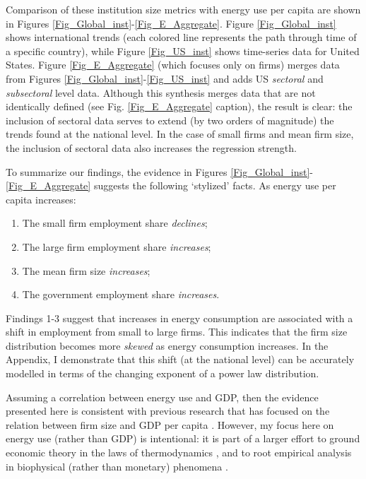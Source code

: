 Comparison of these institution size metrics with energy use per capita are shown in Figures \ref{Fig_Global_inst}-\ref{Fig_E_Aggregate}. Figure \ref{Fig_Global_inst} shows international trends (each colored line represents the path through time of a specific country), while Figure \ref{Fig_US_inst} shows time-series data for United States. Figure \ref{Fig_E_Aggregate} (which focuses only on firms) merges data from Figures \ref{Fig_Global_inst}-\ref{Fig_US_inst} and adds US \emph{sectoral} and \emph{subsectoral} level data. Although this synthesis merges data that are not identically defined (see Fig. \ref{Fig_E_Aggregate} caption), the result is clear: the inclusion of sectoral data serves to extend (by two orders of magnitude) the  trends found at the national level. In the case of small firms and mean firm size, the inclusion of sectoral data also increases the regression strength.


To summarize our findings, the evidence in Figures \ref{Fig_Global_inst}-\ref{Fig_E_Aggregate} suggests the following `stylized' facts. As energy use per capita increases:


\begin{enumerate}[noitemsep]
	\leftskip 3em
	
	\item The small firm employment share \emph{declines};
	\item The large firm employment share \emph{increases};
	\item The mean firm size \emph{increases};
	\item The government employment share \emph{increases}.
	
\end{enumerate}

Findings 1-3 suggest that increases in energy consumption are associated with a shift in employment from small to large firms. This indicates that the firm size distribution becomes more \emph{skewed} as energy consumption increases. In the Appendix, I demonstrate that this shift (at the national level) can be accurately modelled in terms of the changing exponent of a power law distribution.

Assuming a correlation between energy use and GDP, then the evidence presented here is consistent with previous research that has focused on the relation between firm size and GDP per capita  \cite{beck_financial_2003,biggs_what_1986,gollin_nobodys_2008,lucas_jr_size_1978,poschke_firm_2014}.
However, my focus here on energy use (rather than GDP) is intentional: it is part of a larger effort to ground economic theory in the laws of thermodynamics \cite{georgescu-roegen_entropy_1971}, and to root empirical analysis in  biophysical (rather than monetary) phenomena \cite{ayres_exergy_2003,cleveland_energy_1984,fix_rethinking_2015,hall_energy_2012}.

